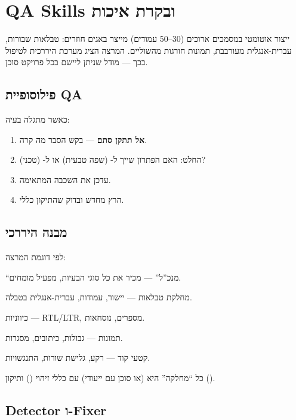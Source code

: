 \section{QA Skills ובקרת איכות}

ייצור  אוטומטי במסמכים ארוכים (30--50 עמודים) מייצר באגים חוזרים:
טבלאות שבורות, עברית-אנגלית מעורבבת, תמונות חורגות מהשוליים. המרצה
הציג מערכת  היררכית לטיפול בכך --- מודל שניתן ליישם
בכל פרויקט סוכן.



\subsection{פילוסופיית QA}

כאשר מתגלה בעיה:
\begin{enumerate}[rightmargin=2em]
  \item \textbf{אל תתקן סתם} --- בקש הסבר מה קרה.
  \item החלט: האם הפתרון שייך ל- (שפה טבעית) או ל- (טכני)?
  \item עדכן את השכבה המתאימה.
  \item הרץ מחדש ובדוק שהתיקון כללי.
\end{enumerate}

\subsection{מבנה היררכי}

לפי דוגמת המרצה:
\begin{description}[rightmargin=2em, style=nextline]
  \item[QA Super] ``מנכ''ל'' --- מכיר את כל סוגי הבעיות, מפעיל מומחים.
  \item[QA Table] מחלקת טבלאות --- יישור, עמודות, עברית-אנגלית בטבלה.
  \item[QA Bidi] כיווניות --- RTL/LTR, מספרים, נוסחאות.
  \item[QA Image] תמונות --- גבולות, כיתובים, מסגרות.
  \item[QA Code] קטעי קוד --- רקע, גלישת שורות, התנגשויות.
\end{description}

כל ``מחלקה'' היא  (או סוכן עם  ייעודי) עם כללי
זיהוי () ותיקון ().

\subsection{Detector ו-Fixer}

